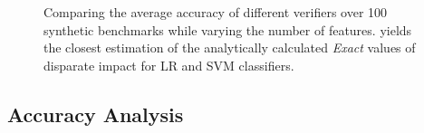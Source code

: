 \begin{figure}
	\begin{center}	
	\end{center}
	\caption[Accuracy of {\fvgm}]{Comparing the average accuracy of different verifiers over 100 synthetic benchmarks while varying the number of features. {\fvgm} yields the closest estimation of the analytically calculated \textit{Exact} values of disparate impact for LR and SVM classifiers.}\label{fvgm_fig:sanity_exp}
\end{figure}
\subsection{Accuracy Analysis}
